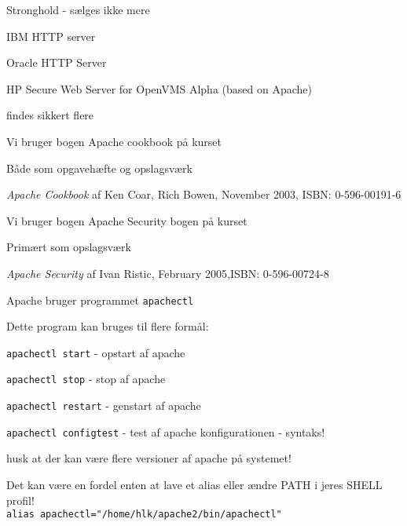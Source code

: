 
\begin{list2}
\item Stronghold - sælges ikke mere\\
\item IBM HTTP server\\
\item Oracle HTTP Server
\item HP Secure Web Server for OpenVMS Alpha (based on Apache)
\item findes sikkert flere 
\end{list2}

\centerline{}




\begin{list2}
\item Vi bruger bogen Apache cookbook på kurset
\item Både som opgavehæfte og opslagsværk
\item \emph{Apache Cookbook} af Ken Coar, Rich Bowen, November 2003,
ISBN: 0-596-00191-6
\end{list2}



\begin{list2}
\item Vi bruger bogen Apache Security bogen på kurset
\item Primært som opslagsværk
\item \emph{Apache Security} af Ivan Ristic, February 2005,ISBN: 0-596-00724-8
\end{list2}


\begin{list1}
\item Apache bruger programmet \verb+apachectl+  
\item Dette program kan bruges til flere formål:
\begin{list2}
\item \verb+apachectl start+ - opstart af apache    
\item \verb+apachectl stop+ - stop af apache
\item \verb+apachectl restart+ - genstart af apache    
\item \verb+apachectl configtest+ - test af apache konfigurationen - syntaks!
\end{list2}
\item husk at der kan være flere versioner af apache på systemet!
\item Det kan være en fordel enten at lave et alias eller ændre PATH i
  jeres SHELL profil!\\
\verb+alias apachectl="/home/hlk/apache2/bin/apachectl"+ 
\end{list1}

